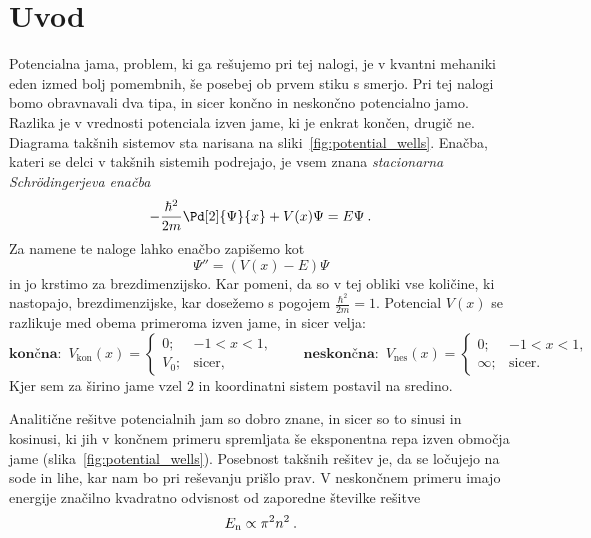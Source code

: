 \documentclass{porocilo}
\begin{document}
\maketitle

\section{Uvod}
Potencialna jama, problem, ki ga rešujemo pri tej nalogi, je v kvantni mehaniki eden izmed bolj pomembnih, še posebej ob prvem stiku s smerjo. Pri tej nalogi bomo obravnavali dva tipa, in sicer končno in neskončno potencialno jamo. Razlika je v vrednosti potenciala izven jame, ki je enkrat končen, drugič ne. Diagrama takšnih sistemov sta narisana na sliki~\ref{fig:potential_wells}. Enačba, kateri se delci v takšnih sistemih podrejajo, je vsem znana \textit{stacionarna Schr{\"o}dingerjeva enačba}
\begin{equation*}
    - \frac{\hbar^2}{2m} \Pd[2]{\Psi}{x} + V(x) \Psi = E \Psi \>.
\end{equation*}
Za namene te naloge lahko enačbo zapišemo kot
\begin{equation*}
    \Psi'' = \left( V(x) - E \right) \Psi
\end{equation*}
in jo krstimo za brezdimenzijsko. Kar pomeni, da so v tej obliki vse količine, ki nastopajo, brezdimenzijske, kar dosežemo s pogojem $\tfrac{\hbar^2}{2m} = 1$. Potencial $V(x)$ se razlikuje med obema primeroma izven jame, in sicer velja:
\begin{equation}
    \label{eq:potential}
    \textbf{končna:} \enspace
    V_{\text{kon}}(x) =
    \begin{cases}
        0;   & -1 < x < 1,   \\
        V_0; & \text{sicer},
    \end{cases}
    \qquad
    \textbf{neskončna:} \enspace
    V_{\text{nes}}(x) =
    \begin{cases}
        0;      & -1 < x < 1,   \\
        \infty; & \text{sicer}.
    \end{cases} \quad
\end{equation}
Kjer sem za širino jame vzel $2$ in koordinatni sistem postavil na sredino.


\newpage
Analitične rešitve potencialnih jam so dobro znane, in sicer so to sinusi in kosinusi, ki jih v končnem primeru spremljata še eksponentna repa izven območja jame (slika~\ref{fig:potential_wells}). Posebnost takšnih rešitev je, da se ločujejo na sode in lihe, kar nam bo pri reševanju prišlo prav. V neskončnem primeru imajo energije značilno kvadratno odvisnost od zaporedne številke rešitve
\begin{equation*}
    E_{\rm n} \propto \pi^2 n^2 \>.
\end{equation*}
\end{document}
